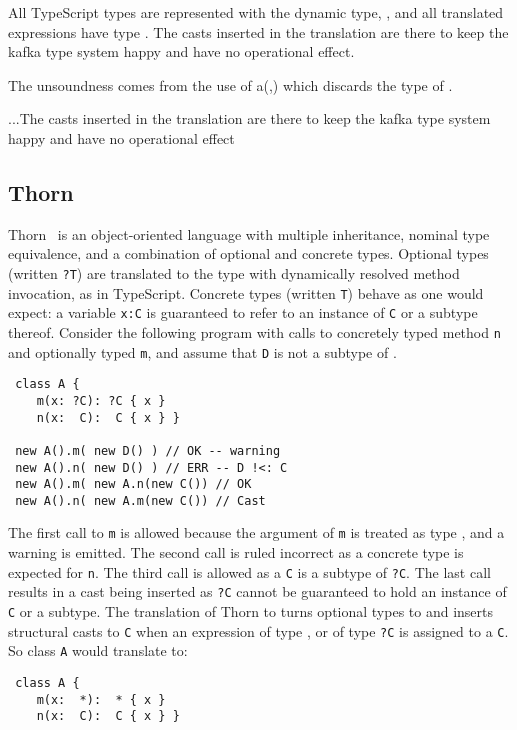 \documentclass[acmlarge, anonymous, authordraft]{acmart}
\newcommand{\code}[1]{{\tt #1}\xspace}
\begin{document}
\noindent  All TypeScript types are represented with the dynamic \kafka type, \any, and all translated expressions have type \any.  The casts inserted in the translation are there to keep the kafka type system happy and have no operational effect.

  The unsoundness comes from the use of \TR a(\any,\e) which discards the type of \e.

...The casts inserted in the translation are there to keep the kafka type system happy and have no operational effect



\subsection{Thorn}

Thorn~\cite{oopsla09} is an object-oriented language with multiple inheritance,
nominal type equivalence, and a combination of optional and concrete types.
Optional types (written \code{?T}) are translated to the \any type with
dynamically resolved method invocation, as in TypeScript. Concrete types
(written \code{T}) behave as one would expect: a variable \code{x:C} is
guaranteed to refer to an instance of \code C or a subtype thereof. Consider the
following program with calls to concretely typed method \code n and optionally
typed \code m, and assume that \code D is not a subtype of \C.

\begin{lstlisting}
 class A {
    m(x: ?C): ?C { x }
    n(x:  C):  C { x } }

 new A().m( new D() ) // OK -- warning
 new A().n( new D() ) // ERR -- D !<: C
 new A().m( new A.n(new C()) // OK
 new A().n( new A.m(new C()) // Cast
\end{lstlisting}

\noindent The first call to \code m is allowed because the argument of \code m
is treated as type \any, and a warning is emitted. The second call is ruled
incorrect as a concrete type is expected for \code n. The third call is allowed
as a \code C is a subtype of \code{?C}. The last call results in a cast being
inserted as \code{?C} cannot be guaranteed to hold an instance of \code{C} or a
subtype.  The translation of Thorn to \kafka turns optional types to \any and
inserts structural casts to \code{C} when an expression of type \any, or of type
\code{?C} is assigned to a \code{C}. So class \code A would translate to:

\begin{lstlisting}
 class A {
    m(x:  *):  * { x }
    n(x:  C):  C { x } }
\end{lstlisting}
\end{document}
